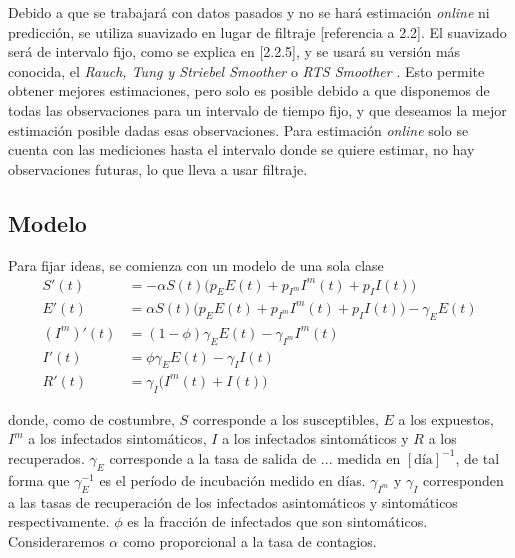 
Debido a que se trabajará con datos pasados y no se hará estimación \textit{online} ni predicción, se utiliza suavizado en lugar de filtraje [referencia a 2.2]. El suavizado será de intervalo fijo, como se explica en [2.2.5], y se usará su versión más conocida, el \textit{Rauch, Tung y Striebel Smoother} o \textit{RTS Smoother} \cite{}\cite{Simon2006}. Esto permite obtener mejores estimaciones, pero solo es posible debido a que disponemos de todas las observaciones para un intervalo de tiempo fijo, y que deseamos la mejor estimación posible dadas esas observaciones. Para estimación \textit{online} solo se cuenta con las mediciones hasta el intervalo donde se quiere estimar, no hay observaciones futuras, lo que lleva a usar filtraje.



\subsection{Modelo}

Para fijar ideas, se comienza con un modelo de una sola clase 
\begin{equation}
\begin{aligned}
S'(t) &= -\alpha S(t)\big( p_E E(t) + p_{I^m}I^m(t) + p_I I(t)\big) \\
E'(t) &= \alpha S(t)\big( p_E E(t) + p_{I^m}I^m(t) + p_I I(t)\big) - \gamma_E E(t) \\ 
(I^m)'(t) &= (1-\phi) \gamma_E E(t) - \gamma_{I^m} I^m(t)\\
I'(t) &= \phi \gamma_E E(t) - \gamma_{I} I(t)\\
R'(t) &= \gamma_{I} \big( I^m(t) + I(t) \big)
\end{aligned}
\end{equation}

donde, como de costumbre, \(S\) corresponde a los susceptibles, \(E\) a los expuestos, \(I^m\) a los infectados sintomáticos, \(I\) a los infectados sintomáticos y \(R\) a los recuperados. \(\gamma_E\) corresponde a la tasa de salida de ... medida en \([\text{día}]^{-1}\), de tal forma que \(\gamma_E^{-1}\) es el período de incubación medido en \(\text{día}\)s. \(\gamma_{I^m}\) y \(\gamma_I\) corresponden a las tasas de recuperación de los infectados asintomáticos y sintomáticos respectivamente. \(\phi\) es la fracción de infectados que son sintomáticos. Consideraremos \(\alpha\) como proporcional a la tasa de contagios.

